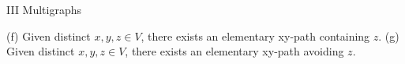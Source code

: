 III Multigraphs

(f) Given distinct $x, y, z \in V$, there exists an elementary xy-path containing $z$.
(g) Given distinct $x, y, z \in V$, there exists an elementary xy-path avoiding $z$.

